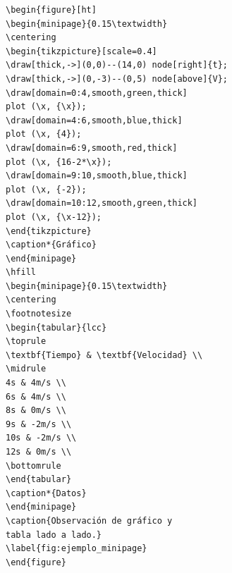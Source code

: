 \begin{verbatim}
\begin{figure}[ht]
\begin{minipage}{0.15\textwidth}
\centering
\begin{tikzpicture}[scale=0.4]
\draw[thick,->](0,0)--(14,0) node[right]{t};
\draw[thick,->](0,-3)--(0,5) node[above]{V};
\draw[domain=0:4,smooth,green,thick] 
plot (\x, {\x});
\draw[domain=4:6,smooth,blue,thick] 
plot (\x, {4});
\draw[domain=6:9,smooth,red,thick] 
plot (\x, {16-2*\x});
\draw[domain=9:10,smooth,blue,thick] 
plot (\x, {-2});
\draw[domain=10:12,smooth,green,thick] 
plot (\x, {\x-12});
\end{tikzpicture}
\caption*{Gráfico}
\end{minipage}
\hfill
\begin{minipage}{0.15\textwidth}
\centering
\footnotesize
\begin{tabular}{lcc}
\toprule
\textbf{Tiempo} & \textbf{Velocidad} \\
\midrule
4s & 4m/s \\
6s & 4m/s \\
8s & 0m/s \\
9s & -2m/s \\
10s & -2m/s \\
12s & 0m/s \\
\bottomrule
\end{tabular}
\caption*{Datos}
\end{minipage}
\caption{Observación de gráfico y 
tabla lado a lado.}
\label{fig:ejemplo_minipage}
\end{figure}
\end{verbatim}
